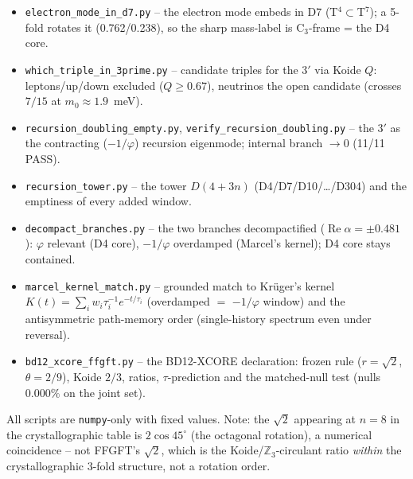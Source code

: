 \begin{itemize}
\item \texttt{electron\_mode\_in\_d7.py} -- the electron mode embeds in D7 (T$^4\subset$T$^7$); a 5-fold rotates it (0.762/0.238), so the sharp mass-label is C$_3$-frame = the D4 core.
\item \texttt{which\_triple\_in\_3prime.py} -- candidate triples for the 3$'$ via Koide $Q$: leptons/up/down excluded ($Q\ge0.67$), neutrinos the open candidate (crosses $7/15$ at $m_0\approx1.9$~meV).
\item \texttt{recursion\_doubling\_empty.py}, \texttt{verify\_recursion\_doubling.py} -- the 3$'$ as the contracting ($-1/\varphi$) recursion eigenmode; internal branch $\to0$ (11/11 PASS).
\item \texttt{recursion\_tower.py} -- the tower $D(4+3n)$ (D4/D7/D10/\dots/D304) and the emptiness of every added window.
\item \texttt{decompact\_branches.py} -- the two branches decompactified ($\operatorname{Re}\alpha=\pm0.481$): $\varphi$ relevant (D4 core), $-1/\varphi$ overdamped (Marcel's kernel); D4 core stays contained.
\item \texttt{marcel\_kernel\_match.py} -- grounded match to Kr\"uger's kernel $K(t)=\sum_i w_i\tau_i^{-1}e^{-t/\tau_i}$ (overdamped $=$ $-1/\varphi$ window) and the antisymmetric path-memory order (single-history spectrum even under reversal).
  \item \texttt{bd12\_xcore\_ffgft.py} -- the BD12-XCORE declaration: frozen rule ($r=\sqrt2$, $\theta=2/9$), Koide $2/3$, ratios, $\tau$-prediction and the matched-null test (nulls $0.000\%$ on the joint set).
\end{itemize}
All scripts are \texttt{numpy}-only with fixed values. Note: the $\sqrt2$ appearing at
$n=8$ in the crystallographic table is $2\cos45^\circ$ (the octagonal rotation), a
numerical coincidence -- not FFGFT's $\sqrt2$, which is the Koide/$\mathbb{Z}_3$-circulant
ratio \emph{within} the crystallographic $3$-fold structure, not a rotation order.
